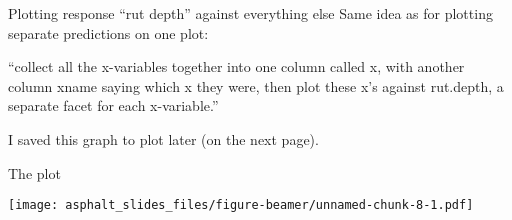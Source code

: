 \begin{frame}[fragile]{Plotting response ``rut depth'' against
everything else}
\protect\hypertarget{plotting-response-rut-depth-against-everything-else}{}
Same idea as for plotting separate predictions on one plot:

\begin{Shaded}
\begin{Highlighting}[]
\OperatorTok{\%\textgreater{}\%}
\StringTok{  }\NormalTok{(}
    \OperatorTok{{-}}
    \NormalTok{, }
\NormalTok{  ) }\OperatorTok{\%\textgreater{}\%}
\StringTok{  }\NormalTok{(}\NormalTok{(}\OperatorTok{+}\StringTok{ }\NormalTok{() }\OperatorTok{+}
\StringTok{  }\NormalTok{(}\OperatorTok{\textasciitilde{}} \NormalTok{) {-}\textgreater{}}\StringTok{ }
\end{Highlighting}
\end{Shaded}

``collect all the x-variables together into one column called x, with
another column xname saying which x they were, then plot these x's
against rut.depth, a separate facet for each x-variable.''

I saved this graph to plot later (on the next page).
\end{frame}

\begin{frame}[fragile]{The plot}
\protect\hypertarget{the-plot}{}
\begin{Shaded}
\begin{Highlighting}[]
\end{Highlighting}
\end{Shaded}

\texttt{[image: asphalt\_slides\_files/figure-beamer/unnamed-chunk-8-1.pdf]}
\end{frame}

